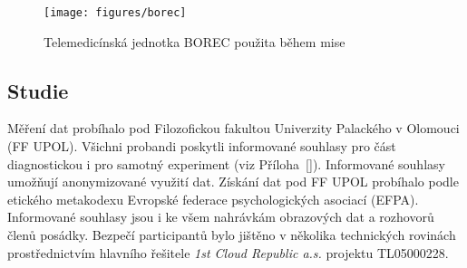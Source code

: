 \begin{figure}[h]
    \begin{center}
        \texttt{[image: figures/borec]}
        \caption{Telemedicínská jednotka \gls{BOREC} použita během mise}
        \label{fig:borec}
    \end{center}
\end{figure}


\subsection{Studie}
\label{subsec:studie}
Měření dat probíhalo pod Filozofickou fakultou Univerzity Palackého v Olomouci
(\gls{FF UPOL}). Všichni probandi poskytli informované souhlasy pro část
diagnostickou i pro samotný experiment (viz Příloha~\ref{}). Informované
souhlasy umožňují anonymizované využití dat. Získání dat pod FF UPOL probíhalo
podle etického metakodexu Evropské federace psychologických asociací
(\gls{EFPA}). Informované souhlasy jsou i ke všem nahrávkám obrazových dat a
rozhovorů členů posádky. Bezpečí participantů bylo jištěno v několika
technických rovinách prostřednictvím hlavního řešitele \textit{1st Cloud
Republic a.s.} projektu TL05000228.